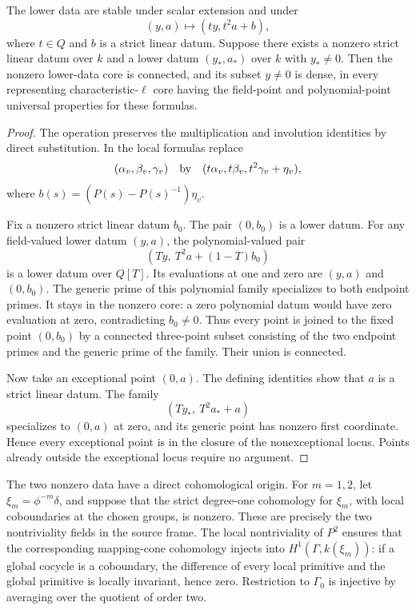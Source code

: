 \begin{srlemma}\label{lem:sr-low-interpolation}
The lower data are stable under scalar extension and under
\[
             (y,a)\longmapsto(ty,t^2a+b),
\]
where $t\in Q$ and $b$ is a strict linear datum.
Suppose there exists a nonzero strict linear datum over $k$ and a lower
datum $(y_*,a_*)$ over $k$ with $y_*\ne0$.
Then the nonzero lower-data core is connected, and its subset
$y\ne0$ is dense, in every representing characteristic-$\ell$ core
having the field-point and polynomial-point universal properties
for these formulas.
\end{srlemma}
\begin{proof}
The operation preserves the multiplication and involution identities
by direct substitution. In the local formulas replace
\[
  (\alpha_v,\beta_v,\gamma_v)
       \quad\hbox{by}\quad
  (t\alpha_v,t\beta_v,t^2\gamma_v+\eta_v),
\]
where $b(s)=(P(s)-P(s)^{-1})\eta_v$.

Fix a nonzero strict linear datum $b_0$.
The pair $(0,b_0)$ is a lower datum.
For any field-valued lower datum $(y,a)$, the polynomial-valued pair
\[
            (Ty,\ T^2a+(1-T)b_0)
\]
is a lower datum over $Q[T]$. Its evaluations at one and zero are
$(y,a)$ and $(0,b_0)$.
The generic prime of this polynomial family specializes to both
endpoint primes. It stays in the nonzero core: a zero polynomial
datum would have zero evaluation at zero, contradicting $b_0\ne0$.
Thus every point is joined to the fixed point $(0,b_0)$ by a connected
three-point subset consisting of the two endpoint primes and the
generic prime of the family. Their union is connected.

Now take an exceptional point $(0,a)$.
The defining identities show that $a$ is a strict linear datum.
The family
\[
                    (Ty_*,\ T^2a_*+a)
\]
specializes to $(0,a)$ at zero, and its generic point has nonzero
first coordinate. Hence every exceptional point is in the closure
of the nonexceptional locus. Points already outside the exceptional
locus require no argument.
\end{proof}

The two nonzero data have a direct cohomological origin.
For $m=1,2$, let $\xi_m=\phi^{-m}\delta$, and suppose that the strict
degree-one cohomology for $\xi_m$, with local coboundaries at the
chosen groups, is nonzero.
These are precisely the two nontriviality fields in the source frame.
The local nontriviality of $P^2$ ensures that the corresponding
mapping-cone cohomology injects into $H^1(\Gamma,k(\xi_m))$:
if a global cocycle is a coboundary, the difference of every local
primitive and the global primitive is locally invariant, hence zero.
Restriction to $\Gamma_0$ is injective by averaging over the quotient
of order two.


